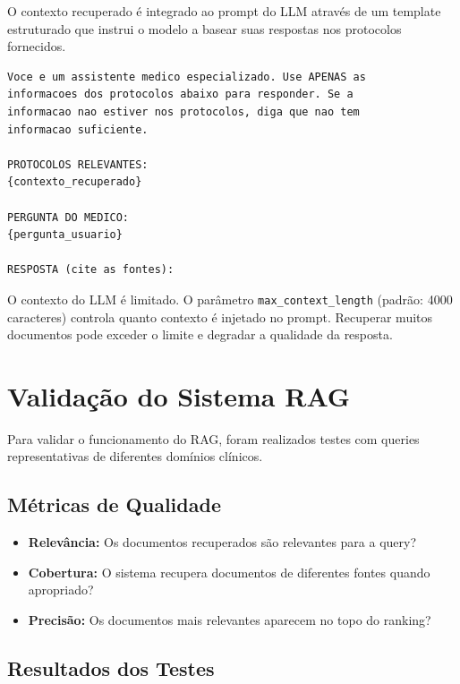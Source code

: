 O contexto recuperado é integrado ao prompt do LLM através de um template estruturado que instrui o modelo a basear suas respostas nos protocolos fornecidos.

\begin{lstlisting}[caption={Template de prompt com contexto RAG.}]
Voce e um assistente medico especializado. Use APENAS as
informacoes dos protocolos abaixo para responder. Se a
informacao nao estiver nos protocolos, diga que nao tem
informacao suficiente.

PROTOCOLOS RELEVANTES:
{contexto_recuperado}

PERGUNTA DO MEDICO:
{pergunta_usuario}

RESPOSTA (cite as fontes):
\end{lstlisting}

\begin{warningbox}
O contexto do LLM é limitado. O parâmetro \texttt{max\_context\_length} (padrão: 4000 caracteres) controla quanto contexto é injetado no prompt. Recuperar muitos documentos pode exceder o limite e degradar a qualidade da resposta.
\end{warningbox}

\section{Validação do Sistema RAG}

Para validar o funcionamento do RAG, foram realizados testes com queries representativas de diferentes domínios clínicos.

\subsection{Métricas de Qualidade}

\begin{itemize}
    \item \textbf{Relevância:} Os documentos recuperados são relevantes para a query?
    \item \textbf{Cobertura:} O sistema recupera documentos de diferentes fontes quando apropriado?
    \item \textbf{Precisão:} Os documentos mais relevantes aparecem no topo do ranking?
\end{itemize}

\subsection{Resultados dos Testes}

